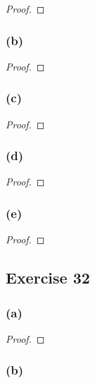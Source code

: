 \documentclass[14pt]{extarticle}
\begin{document}
\begin{proof}

\end{proof}

\subsubsection{(b)}

\begin{proof}

\end{proof}

\subsubsection{(c)}

\begin{proof}

\end{proof}

\subsubsection{(d)}

\begin{proof}

\end{proof}

\subsubsection{(e)}

\begin{proof}

\end{proof}

\subsection{Exercise 32}

\subsubsection{(a)}

\begin{proof}

\end{proof}

\subsubsection{(b)}
\end{document}
